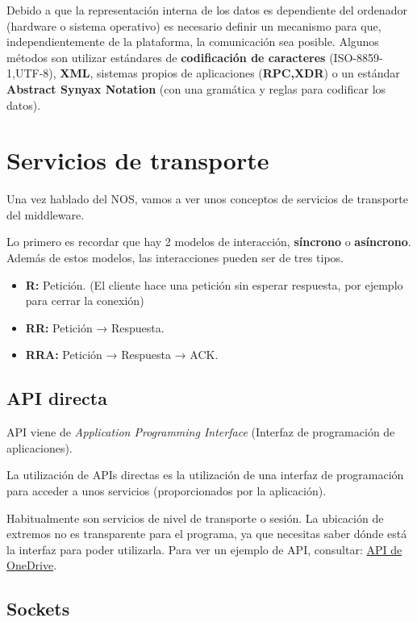\documentclass{apuntes}[nochap]
\begin{document}
Debido a que la representación interna de los datos es dependiente del ordenador (hardware o sistema operativo) es necesario definir un mecanismo para que, independientemente de la plataforma, la comunicación sea posible. Algunos métodos son utilizar estándares de \textbf{codificación de caracteres} (ISO-8859-1,UTF-8), \textbf{XML}, sistemas propios de aplicaciones (\textbf{RPC,XDR}) o un estándar \textbf{Abstract Synyax Notation} (con una gramática y reglas para codificar los datos).


\section{Servicios de transporte}

Una vez hablado del NOS, vamos a ver unos conceptos de  servicios de transporte del middleware.

Lo primero es recordar que hay 2 modelos de interacción, \textbf{síncrono} o \textbf{asíncrono}. Además de estos modelos, las interacciones pueden ser de tres tipos.
\begin{itemize}
	\item \textbf{R:} Petición. (El cliente hace una petición sin esperar respuesta, por ejemplo para cerrar la conexión)
	\item \textbf{RR:} Petición → Respuesta.
	\item \textbf{RRA:} Petición → Respuesta → ACK.
\end{itemize}

\subsection{API directa}

\begin{defn}
API viene de \textit{Application Programming Interface} (Interfaz de programación de aplicaciones).

La utilización de APIs directas es la utilización de una interfaz de programación para acceder a unos servicios (proporcionados por la aplicación).
\end{defn}

Habitualmente son servicios de nivel de transporte o sesión. La ubicación de extremos no es transparente para el programa, ya que necesitas saber dónde está la interfaz para poder utilizarla. Para ver un ejemplo de API, consultar: \href{https://apigee.com/OneDrive/embed/console/OneDrive}{API de OneDrive}.

\subsection{Sockets}
\end{document}
